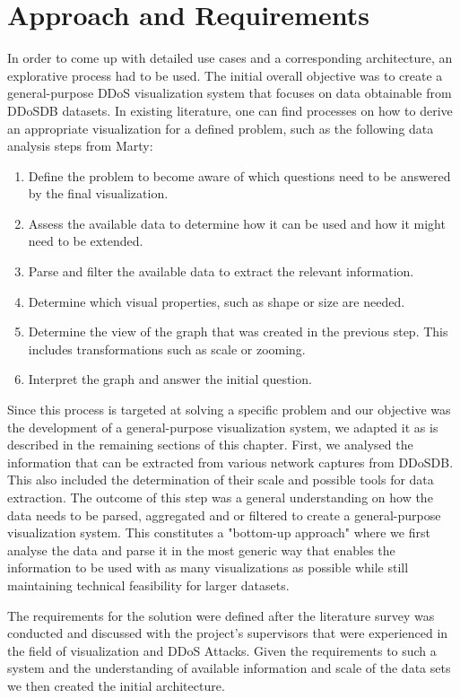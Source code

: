 
\chapter{Approach and Requirements}
In order to come up with detailed use cases and a corresponding architecture, an explorative process had to be used. The initial overall objective was to create a general-purpose DDoS visualization system that focuses on data obtainable from DDoSDB datasets. In existing literature, one can find processes on how to derive an appropriate visualization for a defined problem, such as the following data analysis steps from Marty\cite{appliedsecurityvisualization}:
\begin{enumerate}
    \item Define the problem to become aware of which questions need to be answered by the final visualization.
    \item Assess the available data to determine how it can be used and how it might need to be extended.
    \item Parse and filter the available data to extract the relevant information.
    \item Determine which visual properties, such as shape or size are needed.
    \item Determine the view of the graph that was created in the previous step. This includes transformations such as scale or zooming.
    \item Interpret the graph and answer the initial question.
\end{enumerate}

Since this process is targeted at solving a specific problem and our objective was the development of a general-purpose visualization system, we adapted it as is described in the remaining sections of this chapter. First, we analysed the information that can be extracted from various network captures from DDoSDB. This also included the determination of their scale and possible tools for data extraction. The outcome of this step was a general understanding on how the data needs to be parsed, aggregated and or filtered to create a general-purpose visualization system. This constitutes a "bottom-up approach" where we first analyse the data and parse it in the most generic way that enables the information to be used with as many visualizations as possible while still maintaining technical feasibility for larger datasets.

The requirements for the solution were defined after the literature survey was conducted and discussed with the project's supervisors that were experienced in the field of visualization and DDoS Attacks.
Given the requirements to such a system and the understanding of available information and scale of the data sets we then created the initial architecture.


